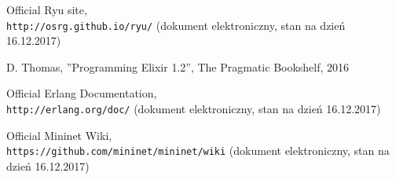 \begin{thebibliography}{99}
Official Ryu site,
\\\texttt{http://osrg.github.io/ryu/} (dokument elektroniczny, stan
na dzień 16.12.2017)

D. Thomas,
''Programming Elixir 1.2'',
The Pragmatic Bookshelf, 2016 

Official Erlang Documentation,
\\\texttt{http://erlang.org/doc/} (dokument elektroniczny, stan
na dzień 16.12.2017)

Official Mininet Wiki,
\\\texttt{https://github.com/mininet/mininet/wiki} (dokument elektroniczny, stan
na dzień 16.12.2017)
\end{thebibliography}